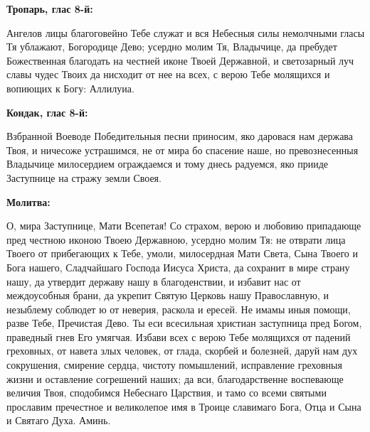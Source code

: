 \bigskip\bigskip\mychapterending


\vspace{-\baselineskip}
 

\bfseries Тропарь, глас 8-й:\normalfont{}\nopagebreak


Ангелов лицы благоговейно Тебе служат и вся Небесныя силы немолчными гласы Тя ублажают, Богородице Дево; усердно молим Тя, Владычице, да пребудет Божественная благодать на честней иконе Твоей Державной, и светозарный луч славы чудес Твоих да нисходит от нее на всех, с верою Тебе молящихся и вопиющих к Богу: Аллилуиа.


\medskip


\bfseries Кондак, глас 8-й:\normalfont{}\nopagebreak


Взбранной Воеводе Победительныя песни приносим, яко даровася нам держава Твоя, и ничесоже устрашимся, не от мира бо спасение наше, но превознесенныя Владычице милосердием ограждаемся и тому днесь радуемся, яко прииде Заступнице на стражу земли Своея.


\medskip


\bfseries Молитва:\normalfont{}\nopagebreak


О, мира Заступнице, Мати Всепетая! Со страхом, верою и любовию припадающе пред честною иконою Твоею Державною, усердно молим Тя: не отврати лица Твоего от прибегающих к Тебе, умоли, милосердная Мати Света, Сына Твоего и Бога нашего, Сладчайшаго Господа Иисуса Христа, да сохранит в мире страну нашу, да утвердит державу нашу в благоденствии, и избавит нас от междоусобныя брани, да укрепит Святую Церковь нашу Православную, и незыблему соблюдет ю от неверия, раскола и ересей. Не имамы иныя помощи, разве Тебе, Пречистая Дево. Ты еси всесильная христиан заступница пред Богом, праведный гнев Его умягчая. Избави всех с верою Тебе молящихся от падений греховных, от навета злых человек, от глада, скорбей и болезней, даруй нам дух сокрушения, смирение сердца, чистоту помышлений, исправление греховныя жизни и оставление согрешений наших; да вси, благодарственне воспевающе величия Твоя, сподобимся Небеснаго Царствия, и тамо со всеми святыми прославим пречестное и великолепое имя в Троице славимаго Бога, Отца и Сына и Святаго Духа. Аминь.


\longpage{}\medskip\mychapterending

 
